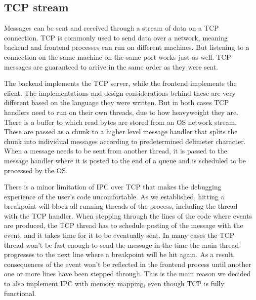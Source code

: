
\subsection{TCP stream}

Messages can be sent and received through a stream of data on a TCP connection. TCP is commonly used to send data over a network, meaning backend and frontend processes can run on different machines. But listening to a connection on the same machine on the same port works just as well. TCP messages are guaranteed to arrive in the same order as they were sent.

The backend implements the TCP server, while the frontend implements the client. The implementations and design considerations behind these are very different based on the language they were written. But in both cases TCP handlers need to run on their own threads, due to how heavyweight they are. There is a buffer to which read bytes are stored from an OS network stream. These are passed as a chunk to a higher level message handler that splits the chunk into individual messages according to predetermined delimeter character. When a message needs to be sent from another thread, it is passed to the message handler where it is posted to the end of a queue and is scheduled to be processed by the OS.

There is a minor limitation of IPC over TCP that makes the debugging experience of the user's code uncomfortable. As we established, hitting a breakpoint will block all running threads of the process, including the thread with the TCP handler. When stepping through the lines of the code where events are produced, the TCP thread has to schedule posting of the message with the event, and it takes time for it to be eventually sent. In many cases the TCP thread won't be fast enough to send the message in the time the main thread progresses to the next line where a breakpoint will be hit again. As a result, consequences of the event won't be reflected in the frontend process until another one or more lines have been stepped through. This is the main reason we decided to also implement IPC with memory mapping, even though TCP is fully functional.

